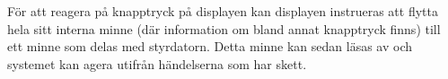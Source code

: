 För att reagera på knapptryck på displayen kan displayen instrueras att flytta
hela sitt interna minne (där information om bland annat knapptryck finns) till
ett minne som delas med styrdatorn. Detta minne kan sedan läsas av och systemet
kan agera utifrån händelserna som har skett.

% 
% 
% 
% 
% 
% 
